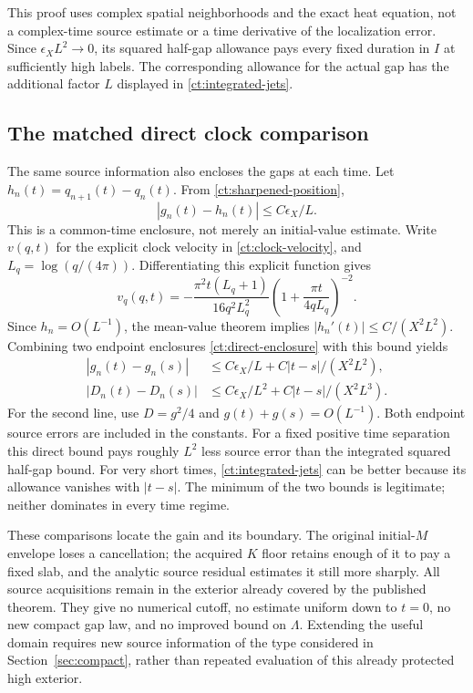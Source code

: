 This proof uses complex spatial neighborhoods and the exact heat
equation, not a complex-time source estimate or a time derivative of
the localization error. Since $\epsilon_X L^2\to0$, its squared
half-gap allowance pays every fixed duration in $I$ at sufficiently
high labels. The corresponding allowance for the actual gap has the
additional factor $L$ displayed in \eqref{ct:integrated-jets}.

\subsection{The matched direct clock comparison}

The same source information also encloses the gaps at each time.
Let $h_n(t)=q_{n+1}(t)-q_n(t)$. From
\eqref{ct:sharpened-position},
\begin{equation}
 |g_n(t)-h_n(t)|\le C\epsilon_X/L.
 \label{ct:direct-enclosure}
\end{equation}
This is a common-time enclosure, not merely an initial-value estimate.
Write $v(q,t)$ for the explicit clock velocity in
\eqref{ct:clock-velocity}, and $L_q=\log(q/(4\pi))$. Differentiating
this explicit function gives
\[
 v_q(q,t)=-\frac{\pi^2t(L_q+1)}{16q^2L_q^2}
          \left(1+\frac{\pi t}{4qL_q}\right)^{-2}.
\]
Since $h_n=O(L^{-1})$, the mean-value theorem implies
$|h_n'(t)|\le C/(X^2L^2)$. Combining two endpoint enclosures
\eqref{ct:direct-enclosure} with this bound yields
\begin{equation}
 \begin{split}
 |g_n(t)-g_n(s)|
 &\le C\epsilon_X/L+C|t-s|/(X^2L^2),\\
 |D_n(t)-D_n(s)|
 &\le C\epsilon_X/L^2+C|t-s|/(X^2L^3).
 \end{split}
 \label{ct:matched-direct}
\end{equation}
For the second line, use $D=g^2/4$ and $g(t)+g(s)=O(L^{-1})$.
Both endpoint source errors are included in the constants. For a fixed
positive time separation this direct bound pays roughly $L^2$ less
source error than the integrated squared half-gap bound. For very short
times, \eqref{ct:integrated-jets} can be better because its allowance
vanishes with $|t-s|$. The minimum of the two bounds is legitimate;
neither dominates in every time regime.

These comparisons locate the gain and its boundary. The original
initial-$M$ envelope loses a cancellation; the acquired $K$ floor
retains enough of it to pay a fixed slab, and the analytic source
residual estimates it still more sharply. All source acquisitions
remain in the exterior already covered by the published theorem.
They give no numerical cutoff, no estimate uniform down to $t=0$,
no new compact gap law, and no improved bound on $\Lambda$. Extending
the useful domain requires new source information of the type considered
in Section~\ref{sec:compact}, rather than repeated evaluation of this
already protected high exterior.
